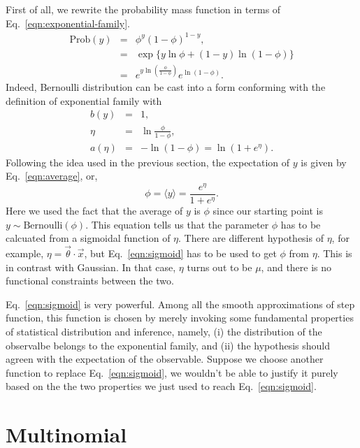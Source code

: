 First of all, we rewrite the probability mass function in terms of Eq.~\ref{eqn:exponential-family}.
\begin{eqnarray}
	\text{Prob}(y) &=& \phi^y(1-\phi)^{1-y},\\
		     &=& \exp\{y\ln\phi + (1-y)\ln(1-\phi)\}\\
	      &=&e^{y\ln\left(\frac{\phi}{1-\phi}\right)}e^{\ln(1-\phi)}.
\end{eqnarray}
Indeed, Bernoulli distribution can be cast into a form conforming with the definition of exponential family with
\begin{eqnarray}
	b(y) &=& 1,\\
	\eta &=& \ln\frac{\phi}{1-\phi},\\\label{eqn:logit}
	a(\eta) &=& -\ln(1-\phi) = \ln\left(1+e^\eta\right).\label{eqn:BernoulliLogP}
\end{eqnarray}
Following the idea used in the previous section, the expectation of $y$ is given by Eq.~\ref{eqn:average}, or,
\begin{equation}
	\phi = \langle y\rangle = \frac{e^\eta}{1+e^\eta}.\label{eqn:sigmoid}
\end{equation}
Here we used the fact that the average of $y$ is $\phi$ since our starting point is $y\sim\text{Bernoulli}(\phi)$. This equation tells us that the parameter $\phi$ has to be calcuated from a sigmoidal function of $\eta$. There are different hypothesis of $\eta$, for example, $\eta = \vec\theta\cdot\vec x$, but Eq.~\ref{eqn:sigmoid} has to be used to get $\phi$ from $\eta$. This is in contrast with Gaussian. In that case, $\eta$ turns out to be $\mu$, and there is no functional constraints between the two.

Eq.~\ref{eqn:sigmoid} is very powerful. Among all the smooth approximations of step function, this function is chosen by merely invoking some fundamental properties of statistical distribution and inference, namely, (i) the distribution of the observalbe belongs to the exponential family, and (ii) the hypothesis should agreen with the expectation of the observable. Suppose we choose another function to replace Eq.~\ref{eqn:sigmoid}, we wouldn't be able to justify it purely based on the the two properties we just used to reach Eq.~\ref{eqn:sigmoid}.

\section{Multinomial}

